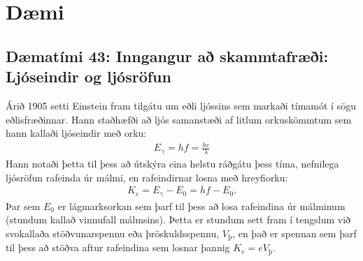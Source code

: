 \newpage

\section{Dæmi}

\subsection*{Dæmatími 43: Inngangur að skammtafræði: Ljóseindir og ljósröfun}

\begin{tcolorbox}
Árið 1905 setti Einstein fram tilgátu um eðli ljóssins sem markaði tímamót í sögu eðlisfræðinnar. Hann staðhæfði að ljós samanstæði af litlum orkuskömmtum sem hann kallaði ljóseindir með orku:
\begin{align*}
    E_\gamma = hf = \frac{hc}{\lambda}
\end{align*}
Hann notaði þetta til þess að útskýra eina helstu ráðgátu þess tíma, nefnilega ljósröfun rafeinda úr málmi, en rafeindirnar losna með hreyfiorku:
\begin{align*}
    K_e = E_{\gamma} - E_0 = hf - E_0.
\end{align*}
Þar sem $E_0$ er lágmarksorkan sem þarf til þess að losa rafeindina úr málminum (stundum kallað vinnufall málmsins). Þetta er stundum sett fram í tengslum við svokallaða stöðvunarspennu eða þröskuldsspennu, $V_{\text{þ}}$, en það er spennan sem þarf til þess að stöðva aftur rafeindina sem losnar þannig $K_e = eV_{\text{þ}}$.
\end{tcolorbox}

